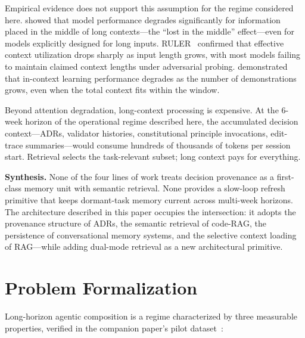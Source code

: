 \documentclass[11pt]{article}
\begin{document}
Empirical evidence does not support this assumption for the regime considered here.
\citet{liu2023lost} showed that model performance degrades significantly for information placed in the middle of long contexts---the ``lost in the middle'' effect---even for models explicitly designed for long inputs.
RULER~\citep{hsieh2024ruler} confirmed that effective context utilization drops sharply as input length grows, with most models failing to maintain claimed context lengths under adversarial probing.
\citet{li2024longcontextbench} demonstrated that in-context learning performance degrades as the number of demonstrations grows, even when the total context fits within the window.

Beyond attention degradation, long-context processing is expensive.
At the 6-week horizon of the operational regime described here, the accumulated decision context---ADRs, validator histories, constitutional principle invocations, edit-trace summaries---would consume hundreds of thousands of tokens per session start.
Retrieval selects the task-relevant subset; long context pays for everything.

\medskip

\noindent\textbf{Synthesis.}
None of the four lines of work treats decision provenance as a first-class memory unit with semantic retrieval.
None provides a slow-loop refresh primitive that keeps dormant-task memory current across multi-week horizons.
The architecture described in this paper occupies the intersection: it adopts the provenance structure of ADRs, the semantic retrieval of code-RAG, the persistence of conversational memory systems, and the selective context loading of RAG---while adding dual-mode retrieval as a new architectural primitive.


\section{Problem Formalization}
\label{sec:problem}

Long-horizon agentic composition is a regime characterized by three measurable properties, verified in the companion paper's pilot dataset~\citep[\S3--4]{ovcharov2026recursive}:
\end{document}
